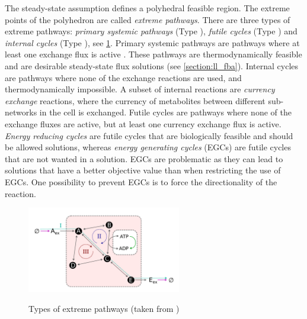 The steady-state assumption defines a polyhedral feasible region. The extreme points of the polyhedron are called \textit{extreme pathways}.
There are three types of extreme pathways: \textit{primary systemic pathways} (Type ), \textit{futile cycles} (Type ) and \textit{internal cycles} (Type ), see \cref{fig:extreme_pathways}. 
Primary systemic pathways are pathways where at least one exchange flux is active %
. These pathways are thermodynamically feasible and are desirable steady-state flux solutions (see \cref{section:ll_fba}). Internal cycles are pathways where none of the exchange reactions are used, and thermodynamically impossible. 
A subset of internal reactions are \textit{currency exchange} reactions, where the currency of metabolites between different sub-networks in the cell is exchanged. Futile cycles are pathways where none of the exchange fluxes are active, but at least one currency exchange flux is active. \textit{Energy reducing cycles} are futile cycles that are biologically feasible and should be allowed solutions, whereas \textit{energy generating cycles} (EGCs) are futile cycles that are not wanted in a solution. EGCs are problematic as they can lead to solutions that have a better objective value than when restricting the use of EGCs. One possibility to prevent EGCs is to force the directionality of the reaction. 
\cite{noor_removing_2018}
\begin{figure}[h!]
    \caption{Types of extreme pathways (taken from \cite{noor_removing_2018})}
    \centering
    \includegraphics[width=0.6\textwidth]{Images/extreme_pathways.png}
    \label{fig:extreme_pathways}
\end{figure}

